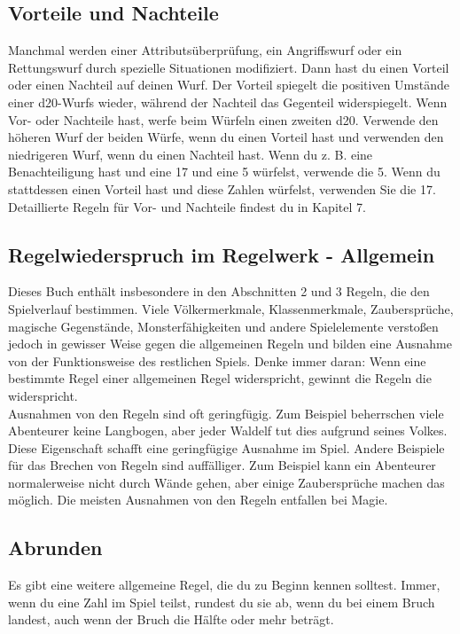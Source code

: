 \subsection{Vorteile und Nachteile}
Manchmal werden einer Attributsüberprüfung, ein Angriffswurf oder ein Rettungswurf durch spezielle Situationen modifiziert. Dann hast du einen Vorteil oder einen Nachteil auf deinen Wurf. Der Vorteil spiegelt die positiven Umstände einer d20-Wurfs wieder, während der Nachteil das Gegenteil widerspiegelt. Wenn Vor- oder Nachteile hast, werfe beim Würfeln einen zweiten d20. Verwende den höheren Wurf der beiden Würfe, wenn du einen Vorteil hast und verwenden den niedrigeren Wurf, wenn du einen Nachteil hast. Wenn du z. B. eine Benachteiligung hast und eine 17 und eine 5 würfelst, verwende die 5. Wenn du stattdessen einen Vorteil hast und diese Zahlen würfelst, verwenden Sie die 17. Detaillierte Regeln für Vor- und Nachteile findest du in Kapitel 7.

\subsection{Regelwiederspruch im Regelwerk - Allgemein}
Dieses Buch enthält insbesondere in den Abschnitten 2 und 3 Regeln, die den Spielverlauf bestimmen. Viele Völkermerkmale, Klassenmerkmale, Zaubersprüche, magische Gegenstände, Monsterfähigkeiten und andere Spielelemente verstoßen jedoch in gewisser Weise gegen die allgemeinen Regeln und bilden eine Ausnahme von der Funktionsweise des restlichen Spiels. Denke immer daran: Wenn eine bestimmte Regel einer allgemeinen Regel widerspricht, gewinnt die Regeln die widerspricht. \\
Ausnahmen von den Regeln sind oft geringfügig. Zum Beispiel beherrschen viele Abenteurer keine Langbogen, aber jeder Waldelf tut dies aufgrund seines Volkes. Diese Eigenschaft schafft eine geringfügige Ausnahme im Spiel. Andere Beispiele für das Brechen von Regeln sind auffälliger. Zum Beispiel kann ein Abenteurer normalerweise nicht durch Wände gehen, aber einige Zaubersprüche machen das möglich. Die meisten Ausnahmen von den Regeln entfallen bei Magie.

\subsection{Abrunden}
Es gibt eine weitere allgemeine Regel, die du zu Beginn kennen solltest. Immer, wenn du eine Zahl im Spiel teilst, rundest du sie ab, wenn du bei einem Bruch landest, auch wenn der Bruch die Hälfte oder mehr beträgt.


